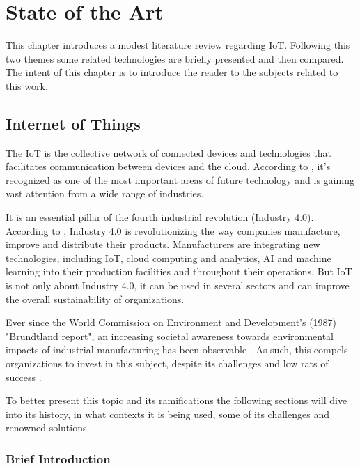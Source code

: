 \chapter{State of the Art}
\label{chap:stateofart}

This chapter introduces a modest literature review regarding \gls{IoT}.
Following this two themes some related technologies are briefly presented and then compared.
The intent of this chapter is to introduce the reader to the subjects related to this work.

\section{Internet of Things}
\label{sec:stateofart:iot}

The \gls{IoT} is the collective network of connected devices and technologies that facilitates communication between devices and the cloud. According to \cite{LEE2015431}, it's recognized as one of the most important areas of future technology and is gaining vast attention from a wide range of industries.

It is an essential pillar of the fourth industrial revolution (Industry 4.0). According to \cite{ibm-industry4}, Industry 4.0 is revolutionizing the way companies manufacture, improve and distribute their products. Manufacturers are integrating new technologies, including \gls{IoT}, cloud computing and analytics, AI and machine learning into their production facilities and throughout their operations.
But \gls{IoT} is not only about Industry 4.0, it can be used in several sectors and can improve the overall sustainability of organizations.

Ever since the World Commission on Environment and Development's (1987) "Brundtland report", an increasing societal awareness towards environmental impacts of industrial manufacturing has been observable \parencite{sus}. As such, this compels organizations to invest in this subject, despite its challenges and low rats of success \parencite{iot-fail}.

To better present this topic and its ramifications the following sections will dive into its history, in what contexts it is being used, some of its challenges and renowned solutions.

\subsection{Brief Introduction}
\label{subsec:stateofart:iot:intro}

